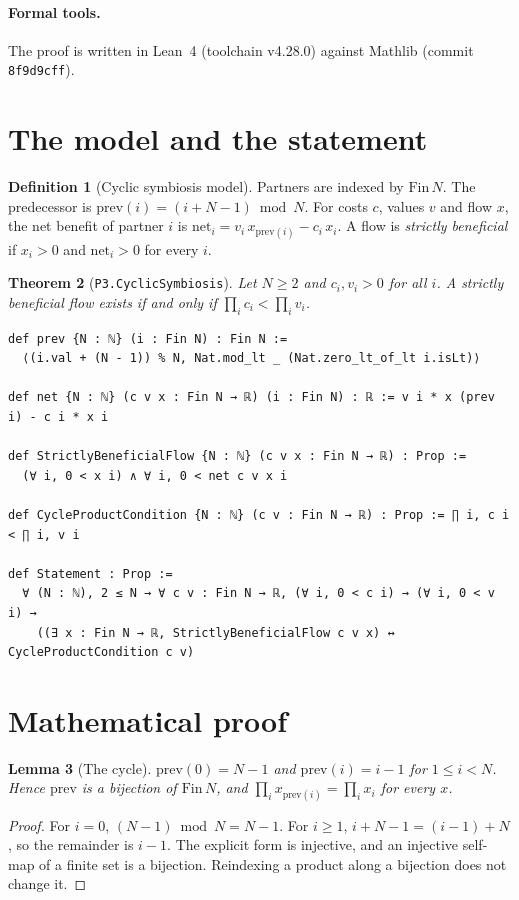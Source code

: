 \documentclass[11pt]{article}
\newtheorem{theorem}{Theorem}
\newtheorem{lemma}[theorem]{Lemma}
\theoremstyle{definition}
\newtheorem{definition}[theorem]{Definition}
\theoremstyle{remark}
\begin{document}
\paragraph{Formal tools.}
The proof is written in Lean~4 \citep{moura2021lean4} (toolchain v4.28.0) against Mathlib
\citep{mathlib2020} (commit \texttt{8f9d9cff}).

\section{The model and the statement}
\label{sec:model}
\begin{definition}[Cyclic symbiosis model]
Partners are indexed by $\mathrm{Fin}\,N$. The predecessor is
$\mathrm{prev}(i)=(i+N-1)\bmod N$. For costs $c$, values $v$ and flow $x$, the net benefit of
partner $i$ is $\mathrm{net}_i=v_i\,x_{\mathrm{prev}(i)}-c_i\,x_i$. A flow is \emph{strictly
beneficial} if $x_i>0$ and $\mathrm{net}_i>0$ for every $i$.
\end{definition}

\begin{theorem}[\texttt{P3.CyclicSymbiosis}]\label{thm:main}
Let $N\ge2$ and $c_i,v_i>0$ for all $i$. A strictly beneficial flow exists if and only if
$\prod_ic_i<\prod_iv_i$.
\end{theorem}

\begin{lstlisting}[caption={Definitions and \texttt{Statement} from the sealed module \texttt{ViridisStatements.P3.CyclicSymbiosis} (docstrings omitted).}]
def prev {N : ℕ} (i : Fin N) : Fin N :=
  ⟨(i.val + (N - 1)) % N, Nat.mod_lt _ (Nat.zero_lt_of_lt i.isLt)⟩

def net {N : ℕ} (c v x : Fin N → ℝ) (i : Fin N) : ℝ := v i * x (prev i) - c i * x i

def StrictlyBeneficialFlow {N : ℕ} (c v x : Fin N → ℝ) : Prop :=
  (∀ i, 0 < x i) ∧ ∀ i, 0 < net c v x i

def CycleProductCondition {N : ℕ} (c v : Fin N → ℝ) : Prop := ∏ i, c i < ∏ i, v i

def Statement : Prop :=
  ∀ (N : ℕ), 2 ≤ N → ∀ c v : Fin N → ℝ, (∀ i, 0 < c i) → (∀ i, 0 < v i) →
    ((∃ x : Fin N → ℝ, StrictlyBeneficialFlow c v x) ↔ CycleProductCondition c v)
\end{lstlisting}

\section{Mathematical proof}
\label{sec:math}
\begin{lemma}[The cycle]\label{lem:prev}
$\mathrm{prev}(0)=N-1$ and $\mathrm{prev}(i)=i-1$ for $1\le i<N$. Hence $\mathrm{prev}$ is a
bijection of $\mathrm{Fin}\,N$, and $\prod_ix_{\mathrm{prev}(i)}=\prod_ix_i$ for every $x$.
\end{lemma}
\begin{proof}
For $i=0$, $(N-1)\bmod N=N-1$. For $i\ge1$, $i+N-1=(i-1)+N$, so the remainder is $i-1$. The
explicit form is injective, and an injective self-map of a finite set is a bijection. Reindexing a
product along a bijection does not change it.
\end{proof}
\end{document}
